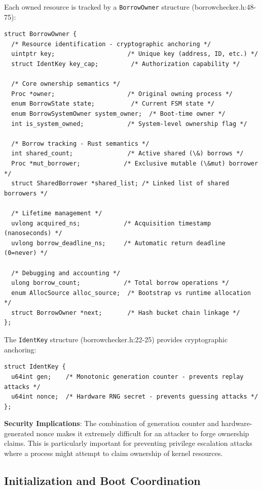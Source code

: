 \documentclass[11pt,letterpaper]{article}
\begin{document}
Each owned resource is tracked by a \texttt{BorrowOwner} structure (borrowchecker.h:48-75):

\begin{lstlisting}
struct BorrowOwner {
  /* Resource identification - cryptographic anchoring */
  uintptr key;                    /* Unique key (address, ID, etc.) */
  struct IdentKey key_cap;         /* Authorization capability */
  
  /* Core ownership semantics */
  Proc *owner;                    /* Original owning process */
  enum BorrowState state;          /* Current FSM state */
  enum BorrowSystemOwner system_owner;  /* Boot-time owner */
  int is_system_owned;            /* System-level ownership flag */
  
  /* Borrow tracking - Rust semantics */
  int shared_count;               /* Active shared (\&) borrows */
  Proc *mut_borrower;            /* Exclusive mutable (\&mut) borrower */
  struct SharedBorrower *shared_list; /* Linked list of shared borrowers */
  
  /* Lifetime management */
  uvlong acquired_ns;            /* Acquisition timestamp (nanoseconds) */
  uvlong borrow_deadline_ns;     /* Automatic return deadline (0=never) */
  
  /* Debugging and accounting */
  ulong borrow_count;            /* Total borrow operations */
  enum AllocSource alloc_source;  /* Bootstrap vs runtime allocation */
  struct BorrowOwner *next;       /* Hash bucket chain linkage */
};
\end{lstlisting}

The \texttt{IdentKey} structure (borrowchecker.h:22-25) provides cryptographic anchoring:

\begin{lstlisting}
struct IdentKey {
  u64int gen;    /* Monotonic generation counter - prevents replay attacks */
  u64int nonce;  /* Hardware RNG secret - prevents guessing attacks */
};
\end{lstlisting}

\textbf{Security Implications}: The combination of generation counter and hardware-generated nonce makes it extremely difficult for an attacker to forge ownership claims. This is particularly important for preventing privilege escalation attacks where a process might attempt to claim ownership of kernel resources.

\subsection{Initialization and Boot Coordination}
\end{document}
